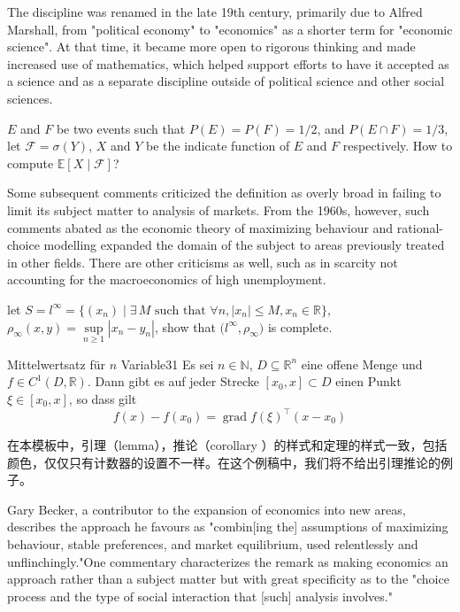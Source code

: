 \documentclass[titlestyle=hang,11pt]{elegantbook}
\begin{document}
The discipline was renamed in the late 19th century, primarily due to Alfred Marshall, from "political economy" to "economics" as a shorter term for "economic science". At that time, it became more open to rigorous thinking and made increased use of mathematics, which helped support efforts to have it accepted as a science and as a separate discipline outside of political science and other social sciences.

\begin{example}
$E$ and $F$ be two events such that $P(E)=
P(F)=1/2$, and $P(E\cap F)=1/3$, let $\mathscr{F}=\sigma(Y)$,  $X$ and $Y$ be the indicate function of $E$ and $F$ respectively. How to compute $\mathbb{E}[ X\mid \mathscr{F} ]$?
\end{example}

Some subsequent comments criticized the definition as overly broad in failing to limit its subject matter to analysis of markets. From the 1960s, however, such comments abated as the economic theory of maximizing behaviour and rational-choice modelling expanded the domain of the subject to areas previously treated in other fields. There are other criticisms as well, such as in scarcity not accounting for the macroeconomics of high unemployment.

\begin{exercise}
let $S=l^\infty=\big\{(x_n)\mid \exists\, M \text{ such that } \forall n, |x_n|\leq M,x_n\in \mathbb{R}\big\}$, $\rho_{\infty}(x,y)=\sup\limits_{n\geq 1}|x_n-y_n|$, show that $\big(l^\infty,\rho_{\infty}\big)$ is complete.
\end{exercise}

\begin{theorem}{Mittelwertsatz f\"{u}r $n$ Variable}{31}
Es sei $n\in\mathbb{N}$, $D\subseteq\mathbb{R}^n$ eine offene Menge und $f\in C^{1}(D,\mathbb{R})$. Dann gibt es auf jeder Strecke $[x_0,x]\subset D$ einen Punkt $\xi\in[x_0,x]$, so dass gilt
\begin{equation*}
   f(x)-f(x_0) = \operatorname{grad} f(\xi)^{\top}(x-x_0)
\end{equation*}
\end{theorem}

\begin{note}
在本模板中，引理（lemma），推论（corollary ）的样式和定理的样式一致，包括颜色，仅仅只有计数器的设置不一样。在这个例稿中，我们将不给出引理推论的例子。
\end{note}


Gary Becker, a contributor to the expansion of economics into new areas, describes the approach he favours as "combin[ing the] assumptions of maximizing behaviour, stable preferences, and market equilibrium, used relentlessly and unflinchingly."One commentary characterizes the remark as making economics an approach rather than a subject matter but with great specificity as to the "choice process and the type of social interaction that [such] analysis involves."
\end{document}
